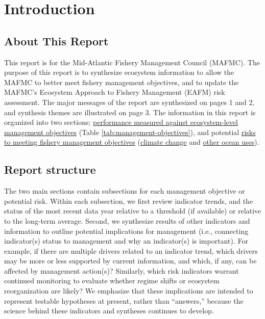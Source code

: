 \documentclass[
  10pt,
]{article}
\author{}
\date{\vspace{-2.5em}}
\begin{document}
\setcounter{page}{4}
\thispagestyle{fancy}

\hypertarget{introduction}{%
\section{Introduction}\label{introduction}}

\hypertarget{about-this-report}{%
\subsection{About This Report}\label{about-this-report}}

This report is for the Mid-Atlantic Fishery Management Council (MAFMC).
The purpose of this report is to synthesize ecosystem information to
allow the MAFMC to better meet fishery management objectives, and to
update the MAFMC's Ecosystem Approach to Fishery Management (EAFM) risk
assessment. The major messages of the report are synthesized on pages 1
and 2, and synthesis themes are illustrated on page 3. The information
in this report is organized into two sections;
\protect\hyperlink{performance-relative-to-fishery-management-objectives}{performance
measured against ecosystem-level management objectives} (Table
\ref{tab:management-objectives}), and potential
\protect\hyperlink{risks-to-meeting-fishery-management-objectives}{risks
to meeting fishery management objectives}
(\protect\hyperlink{climate-and-ecosystem-productivity}{climate change}
and \protect\hyperlink{other-ocean-uses-offshore-wind}{other ocean
uses}).

\hypertarget{report-structure}{%
\subsection{Report structure}\label{report-structure}}

The two main sections contain subsections for each management objective
or potential risk. Within each subsection, we first review indicator
trends, and the status of the most recent data year relative to a
threshold (if available) or relative to the long-term average. Second,
we synthesize results of other indicators and information to outline
potential implications for management (i.e., connecting indicator(s)
status to management and why an indicator(s) is important). For example,
if there are multiple drivers related to an indicator trend, which
drivers may be more or less supported by current information, and which,
if any, can be affected by management action(s)? Similarly, which risk
indicators warrant continued monitoring to evaluate whether regime
shifts or ecosystem reorganization are likely? We emphasize that these
implications are intended to represent testable hypotheses at present,
rather than ``answers,'' because the science behind these indicators and
syntheses continues to develop.
\end{document}
